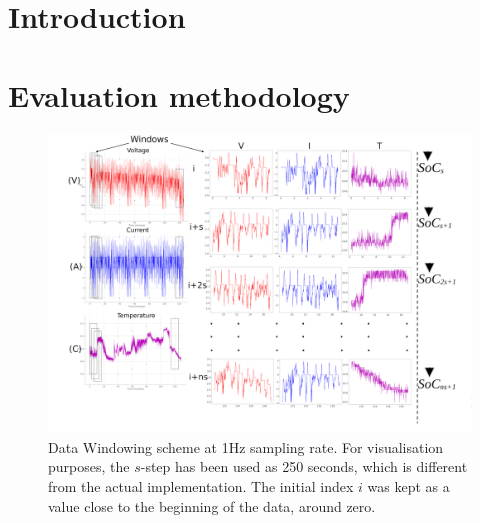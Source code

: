 \documentclass[journal]{IEEEtranTIE}
\begin{document}
%
{}


\section{Introduction} \label{sec:Introduction}

% 
\section{Evaluation methodology} \label{sec:Meth}

    
    
    
    
    \begin{landscape}
        \begin{figure}[ht]
            \centering
            \includegraphics[width=\linewidth]{II_Body/images/windowing3f-A3.jpg}
            \caption{Data Windowing scheme at 1Hz sampling rate. For visualisation purposes, the $s$-step has been used as 250 seconds, which is different from the actual implementation. The initial index $i$ was kept as a value close to the beginning of the data, around zero.}
            \label{fig:Windowing3f}
        \end{figure}
    \end{landscape}
\end{document}
